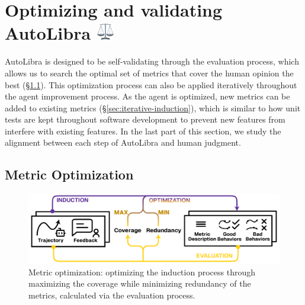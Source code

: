 \section{Optimizing and validating AutoLibra \protect\includegraphics[height=1em]{figs/scale.png}}
AutoLibra is designed to be self-validating through the evaluation process, which allows us to search the optimal set of metrics that cover the human opinion the best (\S\ref{sec:metric-optimization}). 
This optimization process can also be applied iteratively throughout the agent improvement process. As the agent is optimized, new metrics can be added to existing metrics (\S\ref{sec:iterative-induction}), which is similar to how unit tests are kept throughout software development to prevent new features from interfere with existing features. 
In the last part of this section, we study the alignment between each step of AutoLibra and human judgment. 


\subsection{Metric Optimization}
\label{sec:metric-optimization}

\begin{figure}[!t]
    \centering
    \includegraphics[width=0.8\linewidth]{figs/autolibra_optimization.pdf}
    \caption{Metric optimization: optimizing the induction process through maximizing the coverage while minimizing redundancy of the metrics, calculated via the evaluation process.}
    \label{fig:autolibra_optimization}
\end{figure}


